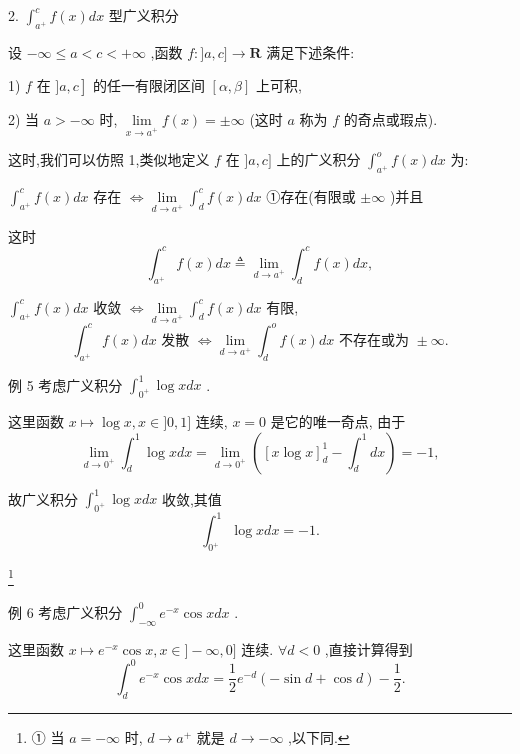 2. ${\int }_{{a}^{ + }}^{c}f\left( x\right) {dx}$ 型广义积分

设 $- \infty  \leq  a < c <  + \infty$ ,函数 $f : \rbrack a,c\rbrack  \rightarrow  \mathbf{R}$ 满足下述条件:

1) $\left. {f\text{ 在 }\rbrack a,c}\right\rbrack$ 的任一有限闭区间 $\left\lbrack  {\alpha ,\beta }\right\rbrack$ 上可积,

2) 当 $a >  - \infty$ 时, $\mathop{\lim }\limits_{{x \rightarrow  {a}^{ + }}}f\left( x\right)  =  \pm  \infty$ (这时 $a$ 称为 $f$ 的奇点或瑕点).

这时,我们可以仿照 1,类似地定义 $f$ 在 $\rbrack a,c\rbrack$ 上的广义积分 ${\int }_{{a}^{ + }}^{o}f\left( x\right) {dx}$ 为:

${\int }_{{a}^{ + }}^{c}f\left( x\right) {dx}$ 存在 $\Leftrightarrow  \mathop{\lim }\limits_{{d \rightarrow  {a}^{ + }}}{\int }_{d}^{c}f\left( x\right) {dx}$ ①存在(有限或 $\pm  \infty$ )并且

这时
$${\int }_{{a}^{ + }}^{c}f\left( x\right) {dx} \triangleq  \mathop{\lim }\limits_{{d \rightarrow  {a}^{ + }}}{\int }_{d}^{c}f\left( x\right) {dx},$$

${\int }_{{a}^{ + }}^{c}f\left( x\right) {dx}$ 收敛 $\Leftrightarrow  \mathop{\lim }\limits_{{d \rightarrow  {a}^{ + }}}{\int }_{d}^{c}f\left( x\right) {dx}$ 有限,
$${\int }_{{a}^{ + }}^{c}f\left( x\right) {dx}\text{ 发散 } \Leftrightarrow  \mathop{\lim }\limits_{{d \rightarrow  {a}^{ + }}}{\int }_{d}^{o}f\left( x\right) {dx}\text{ 不存在或为 } \pm  \infty .$$

例 5 考虑广义积分 ${\int }_{{0}^{ + }}^{1}\log {xdx}$ .

这里函数 $x \mapsto  \log x,x \in  \rbrack 0,1\rbrack$ 连续, $x = 0$ 是它的唯一奇点, 由于
$$\mathop{\lim }\limits_{{d \rightarrow  {0}^{ + }}}{\int }_{d}^{1}\log {xdx} = \mathop{\lim }\limits_{{d \rightarrow  {0}^{ + }}}\left( {{\left\lbrack  x\log x\right\rbrack  }_{d}^{1} - {\int }_{d}^{1}{dx}}\right)  =  - 1,$$

故广义积分 ${\int }_{{0}^{ + }}^{1}\log {xdx}$ 收敛,其值
$${\int }_{{0}^{ + }}^{1}\log {xdx} =  - 1.$$

\footnote{
	
	① 当 $a =  - \infty$ 时, $d \rightarrow  {a}^{ + }$ 就是 $d \rightarrow   - \infty$ ,以下同.
	
}

例 6 考虑广义积分 ${\int }_{-\infty }^{0}{e}^{-x}\cos {xdx}$ .

这里函数 $x \mapsto  {e}^{-x}\cos x,x \in  \rbrack  - \infty ,0\rbrack$ 连续. $\forall d < 0$ ,直接计算得到
$${\int }_{d}^{0}{e}^{-x}\cos {xdx} = \frac{1}{2}{e}^{-d}\left( {-\sin d + \cos d}\right)  - \frac{1}{2}.$$

